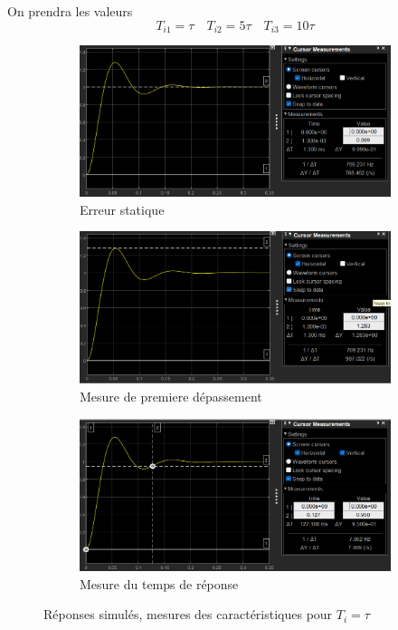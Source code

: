 \documentclass[12pt, a4paper]{report}
\begin{document}
On prendra les valeurs
$$
    T_{i1} = \tau \quad  T_{i2} = 5\tau \quad  T_{i3} = 10\tau 
$$

\begin{figure}[h]
    \begin{subfigure}[h!]{0.46\linewidth}
        \includegraphics[width=\linewidth]{sim1ti1tauerreur.png}
        \caption{Erreur statique}
    \end{subfigure}
    \hfill
    \begin{subfigure}[h!]{0.46\linewidth}
        \includegraphics[width=\linewidth]{sim1ti1tau1erdepassement.png}
        \caption{Mesure de premiere dépassement}
    \end{subfigure}
    \hfill
    \begin{subfigure}[h!]{0.46\linewidth}
        \includegraphics[width=\linewidth]{sim1ti1tautr5prc.png}
        \caption{Mesure du temps de réponse}
    \end{subfigure}
    \caption{Réponses simulés, mesures des caractéristiques pour $T_i = \tau$}
    \label{fig:titau}
\end{figure}
\end{document}
